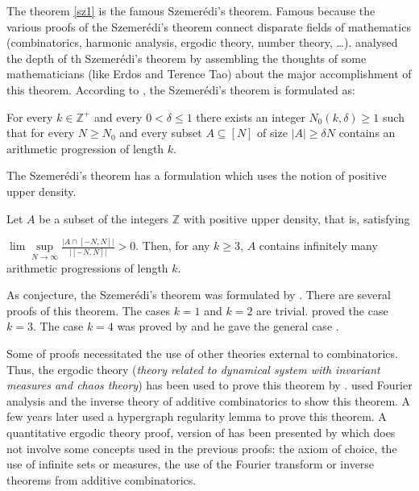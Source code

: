 The  theorem \eqref{sz1} is the famous Szemerédi’s theorem. Famous because the various proofs of the  Szemerédi's theorem connect disparate fields of mathematics (combinatorics, harmonic analysis, ergodic theory,  number theory, \ldots). \cite{arana2015depth} analysed the depth of th  Szemerédi's theorem by assembling the thoughts of some mathematicians (like Erdos and Terence Tao) about the major accomplishment of this theorem. According to \cite{polymath2012new}, the Szemerédi's theorem is formulated as:

\begin{thm}	For every  $k \in \mathbb{Z}^+$ and every $0< \delta \leq  1$ there exists an integer $N_0(k,\delta) \geq 1$ such that for every $N \geq N_0$ and every subset $A \subseteq [N]$ of size $|A|\geq \delta N$ contains an arithmetic progression of length $k.$  \label{sz1} \end{thm}

The Szemerédi's theorem has a formulation which uses the notion of positive upper density. 

Let $A$ be a subset of the integers $\mathbb{Z}$ with positive upper  density, that is, satisfying 

$\lim \sup\limits_{N\rightarrow \infty} \frac{|A \cap[-N,N]|}{|[-N,N]|} > 0.$
Then, for any $k \geq  3$, $A$ contains infinitely many arithmetic progressions of length $k.$

As conjecture, the Szemerédi's theorem was formulated by \cite{JLMS}. There are several proofs of this theorem. The cases $k=1$ and $k=2$ are trivial. \cite{roth1953certain, roth1970irregularities} proved the case $k=3.$ The case $k=4$ was proved by \cite{szemeredi1969sets} and he gave the general case \citep{szemeredi1975sets}.

Some of proofs necessitated the use of other theories external to combinatorics. Thus, the ergodic theory (\textit{theory related to dynamical system with invariant measures and chaos theory})  has been used to prove this theorem by \cite*{furstenberg1977ergodic, furstenberg1982ergodic}.
\cite{gowers1998fourier, gowers2001new}  used Fourier analysis and the inverse theory of additive  combinatorics to show this theorem. A few years later \cite{gowers2007hypergraph} used a hypergraph regularity lemma to prove this theorem. A  quantitative ergodic theory proof, version of \cite{furstenberg1982ergodic} has been presented  by \cite{tao2006quantitative} which does not involve some concepts used in the previous proofs: the axiom of choice, the use of infinite sets or measures, the use of the Fourier transform or inverse theorems from additive combinatorics.

